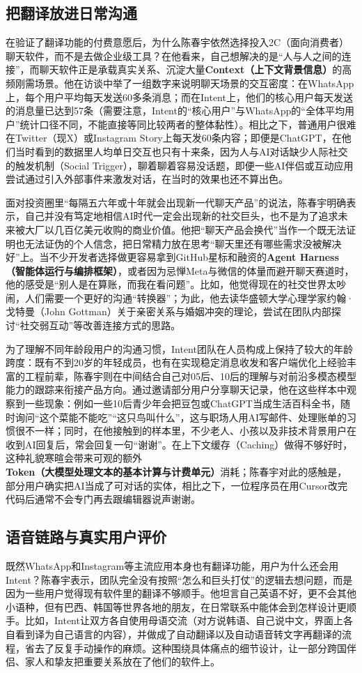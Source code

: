 \documentclass[UTF8,a4paper,11pt,fontset=fandol]{ctexart}
\begin{document}
\subsection{把翻译放进日常沟通}
在验证了翻译功能的付费意愿后，为什么陈春宇依然选择投入2C（面向消费者）聊天软件，而不是去做企业级工具？在他看来，自己想解决的是“人与人之间的连接”，而聊天软件正是承载真实关系、沉淀大量\textbf{Context（上下文背景信息）}的高频刚需场景。他在访谈中举了一组数字来说明聊天场景的交互密度：在WhatsApp上，每个用户平均每天发送60多条消息；而在Intent上，他们的核心用户每天发送的消息量已达到57条（需要注意，Intent的“核心用户”与WhatsApp的“全体平均用户”统计口径不同，不能直接等同比较两者的整体黏性）。相比之下，普通用户很难在Twitter（现X）或Instagram Story上每天发60条内容；即便是ChatGPT，在他们当时看到的数据里人均单日交互也只有十来条，因为人与AI对话缺少人际社交的触发机制（Social Trigger），聊着聊着容易没话题，即便一些AI伴侣或互动应用尝试通过引入外部事件来激发对话，在当时的效果也还不算出色。

面对投资圈里“每隔五六年或十年就会出现新一代聊天产品”的说法，陈春宇明确表示，自己并没有笃定地相信AI时代一定会出现新的社交巨头，也不是为了追求未来被大厂以几百亿美元收购的商业价值。他把“聊天产品会换代”当作一个既无法证明也无法证伪的个人信念，把日常精力放在思考“聊天里还有哪些需求没被解决好”上。当不少开发者选择做更容易拿到GitHub星标和融资的\textbf{Agent Harness（智能体运行与编排框架）}，或者因为忌惮Meta与微信的体量而避开聊天赛道时，他的感受是“别人是在算账，而我在看问题”。比如，他觉得现在的社交世界太吵闹，人们需要一个更好的沟通“转换器”；为此，他去读华盛顿大学心理学家约翰·戈特曼（John Gottman）关于亲密关系与婚姻冲突的理论，尝试在团队内部探讨“社交弱互动”等改善连接方式的思路。

为了理解不同年龄段用户的沟通习惯，Intent团队在人员构成上保持了较大的年龄跨度：既有不到20岁的年轻成员，也有在实现稳定消息收发和客户端优化上经验丰富的工程前辈，陈春宇则在中间结合自己对05后、10后的理解与对前沿多模态模型能力的跟踪来衔接产品方向。通过邀请部分用户分享聊天记录，他在这些样本中观察到一些现象：例如一些10后青少年会把豆包或ChatGPT当成生活百科全书，随时询问“这个菜能不能吃”“这只鸟叫什么”，这与职场人用AI写邮件、处理账单的习惯很不一样；同时，在他接触到的样本里，不少老人、小孩以及非技术背景用户在收到AI回复后，常会回复一句“谢谢”。在上下文缓存（Caching）做得不够好时，这种礼貌寒暄会带来可观的额外\textbf{Token（大模型处理文本的基本计算与计费单元）}消耗；陈春宇对此的感触是，部分用户确实把AI当成了可对话的实体，相比之下，一位程序员在用Cursor改完代码后通常不会专门再去跟编辑器说声谢谢。

\subsection{语音链路与真实用户评价}
既然WhatsApp和Instagram等主流应用本身也有翻译功能，用户为什么还会用Intent？陈春宇表示，团队完全没有按照“怎么和巨头打仗”的逻辑去想问题，而是因为一些用户觉得现有软件里的翻译不够顺手。他坦言自己英语不好，更不会其他小语种，但有巴西、韩国等世界各地的朋友，在日常联系中能体会到怎样设计更顺手。比如，Intent让双方各自使用母语交流（对方说韩语、自己说中文，界面上各自看到译为自己语言的内容），并做成了自动翻译以及自动语音转文字再翻译的流程，省去了反复手动操作的麻烦。这种围绕具体痛点的细节设计，让一部分跨国伴侣、家人和挚友把重要关系放在了他们的软件上。
\end{document}
